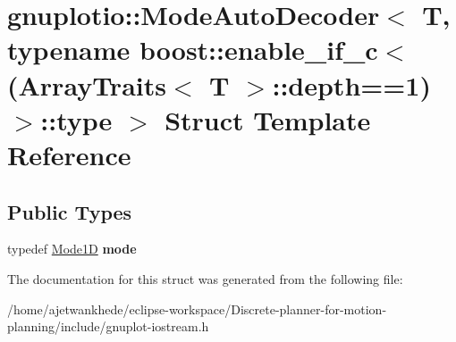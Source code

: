\hypertarget{structgnuplotio_1_1ModeAutoDecoder_3_01T_00_01typename_01boost_1_1enable__if__c_3_07ArrayTraits_c71a7976e6da7615584723a0cdaa6bf6}{}\section{gnuplotio\+:\+:Mode\+Auto\+Decoder$<$ T, typename boost\+:\+:enable\+\_\+if\+\_\+c$<$(Array\+Traits$<$ T $>$\+:\+:depth==1)$>$\+:\+:type $>$ Struct Template Reference}
\label{structgnuplotio_1_1ModeAutoDecoder_3_01T_00_01typename_01boost_1_1enable__if__c_3_07ArrayTraits_c71a7976e6da7615584723a0cdaa6bf6}
\subsection*{Public Types}
\begin{DoxyCompactItemize}
\item 
\mbox{\label{structgnuplotio_1_1ModeAutoDecoder_3_01T_00_01typename_01boost_1_1enable__if__c_3_07ArrayTraits_c71a7976e6da7615584723a0cdaa6bf6_aca42fe1aca7256665654b02e52456496}} 
typedef \mbox{\hyperlink{structgnuplotio_1_1Mode1D}{Mode1D}} {\bfseries mode}
\end{DoxyCompactItemize}


The documentation for this struct was generated from the following file\+:\begin{DoxyCompactItemize}
\item 
/home/ajetwankhede/eclipse-\/workspace/\+Discrete-\/planner-\/for-\/motion-\/planning/include/gnuplot-\/iostream.\+h\end{DoxyCompactItemize}
